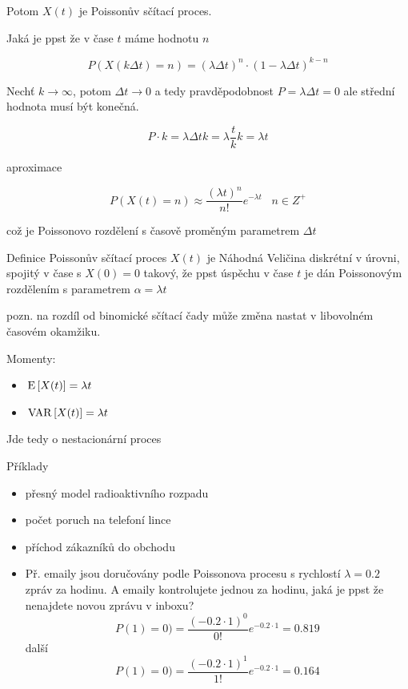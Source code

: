 Potom $X(t)$ je Poissonův sčítací proces.


Jaká je ppst že v čase $t$ máme hodnotu $n$

\[ P(X(k \Delta t) = n) = (\lambda \Delta t)^n \cdot (1 - \lambda\Delta t)^{k-n} \]

Nechť $k \rightarrow \infty$, potom $\Delta t \rightarrow 0$ a tedy pravděpodobnost $P = \lambda \Delta t = 0$
ale střední hodnota musí být konečná.

\[ P \cdot k = \lambda \Delta t k = \lambda \frac{t}{k} k = \lambda t \]

aproximace

\[ P(X(t)=n) \approx \dfrac{(\lambda t)^n}{n!} e^{-\lambda t} \;\;\; n \in Z^+ \]

což je Poissonovo rozdělení s časově proměným parametrem $ \Delta t$

Definice Poissonův sčítací proces $X(t)$ je Náhodná Veličina diskrétní v úrovni, spojitý v čase s $X(0)=0$ takový, že ppst úspěchu v čase $t$ je dán Poissonovým rozdělením s parametrem $ \alpha = \lambda t$

pozn. na rozdíl od binomické sčítací čady může změna nastat v libovolném časovém okamžiku.


Momenty:

\begin{itemize}
	\item $\,\mathrm{E}\left[X(t)\right] = \lambda t$
	\item $\,\mathrm{VAR}\left[X(t)\right] = \lambda t$
\end{itemize}
Jde tedy o nestacionární proces

Příklady
\begin{itemize}
	\item přesný model radioaktivního rozpadu
	\item počet poruch na telefoní lince
	\item příchod zákazníků do obchodu
	\item Př. emaily jsou doručovány podle Poissonova procesu s rychlostí $\lambda = 0.2$ zpráv za hodinu. A emaily kontrolujete jednou za hodinu, jaká je ppst že nenajdete novou zprávu v inboxu? \[ P(1) = 0) = \dfrac{(-0.2 \cdot 1 )^0}{0!} e^{-0.2 \cdot 1} = 0.819 \] další \[ P(1) = 0) = \dfrac{(-0.2 \cdot 1 )^1}{1!} e^{-0.2 \cdot 1} = 0.164 \]
\end{itemize}

